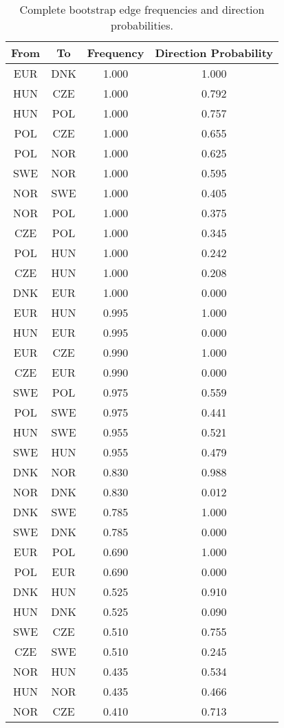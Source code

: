 \begin{table}[!h]
\centering
\caption{Complete bootstrap edge frequencies and direction probabilities.}
\centering
\begin{tabular}[t]{cccc}
\toprule
From & To & Frequency & Direction Probability\\
\midrule
EUR & DNK & 1.000 & 1.000\\
HUN & CZE & 1.000 & 0.792\\
HUN & POL & 1.000 & 0.757\\
POL & CZE & 1.000 & 0.655\\
POL & NOR & 1.000 & 0.625\\
\addlinespace
SWE & NOR & 1.000 & 0.595\\
NOR & SWE & 1.000 & 0.405\\
NOR & POL & 1.000 & 0.375\\
CZE & POL & 1.000 & 0.345\\
POL & HUN & 1.000 & 0.242\\
\addlinespace
CZE & HUN & 1.000 & 0.208\\
DNK & EUR & 1.000 & 0.000\\
EUR & HUN & 0.995 & 1.000\\
HUN & EUR & 0.995 & 0.000\\
EUR & CZE & 0.990 & 1.000\\
\addlinespace
CZE & EUR & 0.990 & 0.000\\
SWE & POL & 0.975 & 0.559\\
POL & SWE & 0.975 & 0.441\\
HUN & SWE & 0.955 & 0.521\\
SWE & HUN & 0.955 & 0.479\\
\addlinespace
DNK & NOR & 0.830 & 0.988\\
NOR & DNK & 0.830 & 0.012\\
DNK & SWE & 0.785 & 1.000\\
SWE & DNK & 0.785 & 0.000\\
EUR & POL & 0.690 & 1.000\\
\addlinespace
POL & EUR & 0.690 & 0.000\\
DNK & HUN & 0.525 & 0.910\\
HUN & DNK & 0.525 & 0.090\\
SWE & CZE & 0.510 & 0.755\\
CZE & SWE & 0.510 & 0.245\\
\addlinespace
NOR & HUN & 0.435 & 0.534\\
HUN & NOR & 0.435 & 0.466\\
NOR & CZE & 0.410 & 0.713\\

\end{tabular}
\end{table}
